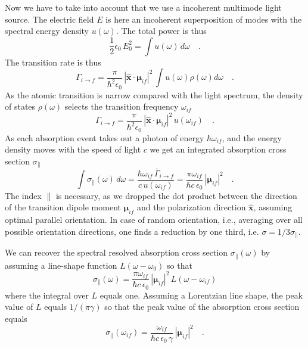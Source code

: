 Now we have to take into account that we use a incoherent multimode light source. The electric field $E$ is here an incoherent superposition of  modes with the  spectral energy density $u(\omega)$.
The total power is thus
\begin{equation}
 \frac{1}{2} \epsilon_0  \, E_0^2  = \int  u(\omega)  \, d\omega \quad .
\end{equation}
The  transition rate is thus 
\begin{equation}
 \Gamma_{i \rightarrow f} =   \frac{\pi  }{\hbar^2 \epsilon_0}  \, |\mathbf{\hat{x}} \cdot \mathbf{\mu}_{if} |^2 \,
\int u(\omega)  
  \rho(\omega)  d \omega \quad .
\end{equation}
As the atomic transition is narrow compared with the light spectrum, the density of states $\rho(\omega)$ selects the transition frequency $\omega_{if}$ 
\begin{equation}
 \Gamma_{i \rightarrow f} =   \frac{\pi  }{\hbar^2 \epsilon_0}  \, |\mathbf{\hat{x}} \cdot \mathbf{\mu}_{if} |^2 \,
 u(\omega_{if})   \quad .
\end{equation}
As each absorption event takes out a photon of energy $\hbar \omega_{if}$, and the energy density moves with the speed of light $c$ we get an integrated absorption cross section $\sigma_{\parallel}$ 
\begin{equation}
 \int \sigma_{\parallel}(\omega) \, d \omega = \frac{ \hbar \omega_{if} \, \bar{\Gamma}_{i \rightarrow f} }{c \, u(\omega_{if})}  = 
  \frac{\pi \omega_{if}}{ \hbar c \, \epsilon_0} \,
 |\mathbf{\mu}_{if} |^2  \quad . \label{eq:abs_sigma_mu}
\end{equation}
The index ${\parallel} $ is necessary, as we dropped the dot product between the direction of the transition dipole moment $\mathbf{\mu}_{if}$ and the polarization direction $\mathbf{\hat{x}}$, assuming optimal parallel orientation. In case of random orientation, i.e., averaging over all possible orientation directions, one finds  a reduction by one third, i.e. $\sigma = 1/3 \sigma_{\parallel}$.

We can recover the spectral resolved absorption cross section $\sigma_{\parallel}(\omega)$ by assuming a line-shape function $L(\omega - \omega_0)$ so that 
\begin{equation}
 \sigma_{\parallel}(\omega) =  \frac{\pi \omega_{if}}{ \hbar c \, \epsilon_0} \,
 |\mathbf{\mu}_{if} |^2 \, L(\omega - \omega_{if})
\end{equation}
where the integral over $L$ equals one. Assuming a Lorentzian line shape, the peak value of $L$ equals $1/(\pi \gamma)$ so that the peak value of the absorption cross section equals
\begin{equation}
 \sigma_{\parallel}(\omega_{if}) =  \frac{\omega_{if}}{ \hbar c \, \epsilon_0 \, \gamma} \,
 |\mathbf{\mu}_{if} |^2  \quad .
\end{equation}


